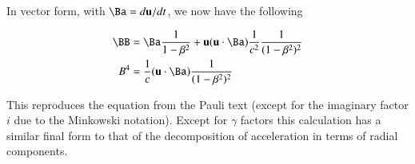 \documentclass{article}
\begin{document}
In vector form, with $\Ba = d\Bu/dt$, we now have the following 

\begin{align*}
\BB &= \Ba \inv{1-\beta^2} + \Bu (\Bu \cdot \Ba) \inv{c^2} \inv{ (1-\beta^2)^2} \\
B^4 &= \inv{c} (\Bu \cdot \Ba) \inv{ (1-\beta^2)^2}
\end{align*}

This reproduces the equation from the Pauli text (except for the imaginary factor $i$ due to the Minkowski notation).  Except for $\gamma$ factors this calculation has a similar final form to that of the decomposition of acceleration in terms of radial components.



\end{document}
